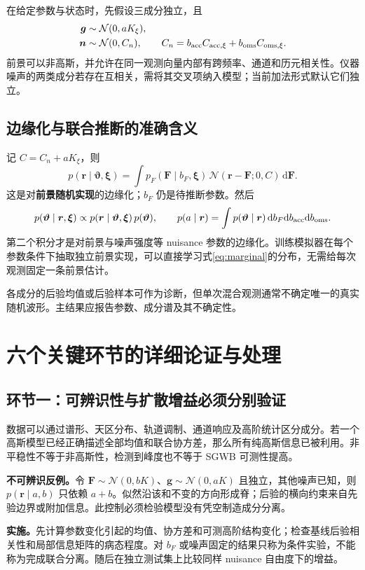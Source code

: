 \documentclass[UTF8,fontset=fandol,a4paper,11pt]{ctexart}
\numberwithin{equation}{section}
\newcommand{\dd}{\mathrm d}
\newcommand{\Normal}{\mathcal N}
\newcommand{\btheta}{\boldsymbol\vartheta}
\newcommand{\bxi}{\boldsymbol\xi}
\newcommand{\br}{\boldsymbol r}
\newcommand{\bF}{\boldsymbol F}
\newcommand{\bn}{\boldsymbol n}
\newcommand{\bg}{\boldsymbol g}
\begin{document}
在给定参数与状态时，先假设三成分独立，且
\begin{align}
\bg&\sim\Normal(0,aK_\xi),\\
\bn&\sim\Normal(0,C_n),\qquad
C_n=b_{\rm acc}C_{{\rm acc},\xi}+b_{\rm oms}C_{{\rm oms},\xi}.
\end{align}
前景可以非高斯，并允许在同一观测向量内部有跨频率、通道和历元相关性。仪器噪声的两类成分若存在互相关，需将其交叉项纳入模型；当前加法形式默认它们独立。

\subsection{边缘化与联合推断的准确含义}
记 $C=C_n+aK_\xi$，则
\begin{equation}
p(\br\mid\btheta,\bxi)=
\int p_F(\bF\mid b_F,\bxi)\,
\Normal(\br-\bF;0,C)\,\dd\bF.
\label{eq:marginal}
\end{equation}
这是对\textbf{前景随机实现}的边缘化；$b_F$ 仍是待推断参数。然后
\begin{equation}
p(\btheta\mid\br,\bxi)\propto
p(\br\mid\btheta,\bxi)\,p(\btheta),
\qquad
p(a\mid\br)=\int p(\btheta\mid\br)\,\dd b_F\dd b_{\rm acc}\dd b_{\rm oms}.
\end{equation}
第二个积分才是对前景与噪声强度等 nuisance 参数的边缘化。训练模拟器在每个参数条件下抽取独立前景实现，可以直接学习式\eqref{eq:marginal}的分布，无需给每次观测固定一条前景估计。

各成分的后验均值或后验样本可作为诊断，但单次混合观测通常不确定唯一的真实随机波形。主结果应报告参数、成分谱及其不确定性。

\section{六个关键环节的详细论证与处理}
\subsection{环节一：可辨识性与扩散增益必须分别验证}
数据可以通过谱形、天区分布、轨道调制、通道响应及高阶统计区分成分。若一个高斯模型已经正确描述全部均值和联合协方差，那么所有纯高斯信息已被利用。非平稳性不等于非高斯性，检测到峰度也不等于 SGWB 可测性提高。

\textbf{不可辨识反例。}令 $\bF\sim\Normal(0,bK)$、$\bg\sim\Normal(0,aK)$ 且独立，其他噪声已知，则 $p(\br\mid a,b)$ 只依赖 $a+b$。似然沿该和不变的方向形成脊；后验的横向约束来自先验边界或附加信息。此控制必须检验模型没有凭空制造成分分离。

\textbf{实施。}先计算参数变化引起的均值、协方差和可测高阶结构变化；检查基线后验相关性和局部信息矩阵的病态程度。对 $b_F$ 或噪声固定的结果只称为条件实验，不能称为完成联合分离。随后在独立测试集上比较同样 nuisance 自由度下的增益。
\end{document}
